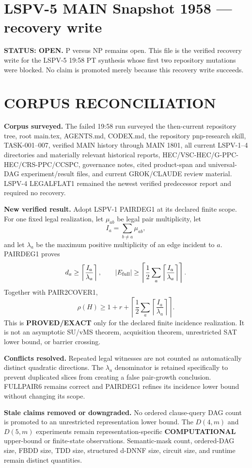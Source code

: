 \documentclass[11pt]{article}
\begin{document}
\section*{LSPV-5 MAIN Snapshot 1958 --- recovery write}
\textbf{STATUS: OPEN.} P versus NP remains open. This file is the verified recovery write for the LSPV-5 19:58 PT synthesis whose first two repository mutations were blocked. No claim is promoted merely because this recovery write succeeds.

\section*{CORPUS RECONCILIATION}
\textbf{Corpus surveyed.}
The failed 19:58 run surveyed the then-current repository tree, root main.tex, AGENTS.md, CODEX.md, the repository pnp-research skill, TASK-001--007, verified MAIN history through MAIN 1801, all current LSPV-1--4 directories and materially relevant historical reports, HEC/VSC-HEC/G-PPC-HEC/CRS-PPC/CCSPC, governance notes, cited product-span and universal-DAG experiment/result files, and current GROK/CLAUDE review material. LSPV-4 LEGALFLAT1 remained the newest verified predecessor report and required no recovery.

\textbf{New verified result.}
Adopt LSPV-1 PAIRDEG1 at its declared finite scope. For one fixed legal realization, let \(\mu_{ab}\) be legal pair multiplicity, let
\[
I_a=\sum_{b\ne a}\mu_{ab},
\]
and let \(\lambda_a\) be the maximum positive multiplicity of an edge incident to \(a\). PAIRDEG1 proves
\[
d_a\ge \left\lceil\frac{I_a}{\lambda_a}\right\rceil,
\qquad
|E_{\rm full}|\ge
\left\lceil\frac12\sum_a
\left\lceil\frac{I_a}{\lambda_a}\right\rceil\right\rceil.
\]
Together with PAIR2COVER1,
\[
\boxed{
\rho(H)\ge
1+r+
\left\lceil\frac12\sum_a
\left\lceil\frac{I_a}{\lambda_a}\right\rceil
\right\rceil }.
\]
This is \textbf{PROVED/EXACT} only for the declared finite incidence realization. It is not an asymptotic SU/vMS theorem, acquisition theorem, unrestricted SAT lower bound, or barrier crossing.

\textbf{Conflicts resolved.}
Repeated legal witnesses are not counted as automatically distinct quadratic directions. The \(\lambda_a\) denominator is retained specifically to prevent duplicated slices from creating a false pair-growth conclusion. FULLPAIR6 remains correct and PAIRDEG1 refines its incidence lower bound without changing its scope.

\textbf{Stale claims removed or downgraded.}
No ordered clause-query DAG count is promoted to an unrestricted representation lower bound. The \(D(4,m)\) and \(D(5,m)\) experiments remain representation-specific \textbf{COMPUTATIONAL} upper-bound or finite-state observations. Semantic-mask count, ordered-DAG size, FBDD size, TDD size, structured d-DNNF size, circuit size, and runtime remain distinct quantities.
\end{document}
